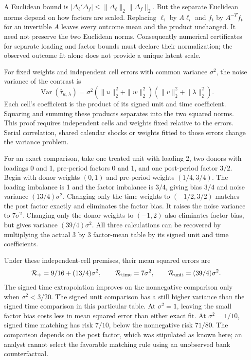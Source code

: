 A Euclidean bound is
$|\Delta_\ell'\Delta_f|\leq\|\Delta_\ell\|_2\|\Delta_f\|_2$.
But the separate Euclidean norms depend on how factors are scaled. Replacing
$\ell_i$ by $A\ell_i$ and $f_t$ by $A^{-T}f_t$ for an invertible $A$
leaves every outcome mean and the product unchanged. It need not preserve
the two Euclidean norms. Consequently numerical certificates for separate
loading and factor bounds must declare their normalization; the observed
outcome fit alone does not provide a unique latent scale.

For fixed weights and independent cell errors with common variance
$\sigma^2$, the noise variance of the contrast is
\begin{equation}
 \operatorname{Var}(\widehat\tau_{w,\lambda})
 =\sigma^2(\|u\|_2^2+\|w\|_2^2)
             (\|v\|_2^2+\|\lambda\|_2^2).
 \label{exec17:s6-sdid-noise}
\end{equation}
Each cell's coefficient is the product of its signed unit and time
coefficient. Squaring and summing these products separates into the two
squared norms. This proof requires independent cells and weights fixed
relative to the errors. Serial correlation, shared calendar shocks or
weights fitted to those errors change the variance problem.

For an exact comparison, take one treated unit with loading 2, two donors
with loadings 0 and 1, pre-period factors 0 and 1, and one post-period
factor $3/2$. Begin with donor weights $(0,1)$ and pre-period weights
$(1/4,3/4)$. The loading imbalance is 1 and the factor imbalance is
$3/4$, giving bias $3/4$ and noise variance $(13/4)\sigma^2$.
Changing only the time weights to $(-1/2,3/2)$ matches the post factor
exactly and eliminates the factor bias. It raises the noise variance to
$7\sigma^2$. Changing only the donor weights to $(-1,2)$ also
eliminates factor bias, but gives variance $(39/4)\sigma^2$.
All three calculations can be recovered by multiplying the actual
$3$ by $3$ factor-mean table by its signed unit and time coefficients.

Under these independent-cell premises, their mean squared errors are
\begin{equation}
 {\cal R}_{+}=9/16+(13/4)\sigma^2,\qquad
 {\cal R}_{\mathrm{time}}=7\sigma^2,\qquad
 {\cal R}_{\mathrm{unit}}=(39/4)\sigma^2.
 \label{exec17:s6-sdid-risk}
\end{equation}
The signed time extrapolation improves on the nonnegative comparison
only when $\sigma^2<3/20$. The signed unit comparison has a still
higher variance than the signed time comparison in this particular table.
At $\sigma^2=1$, leaving the small factor bias costs less in mean
squared error than either exact fit. At $\sigma^2=1/10$, signed time
matching has risk $7/10$, below the nonnegative risk $71/80$.
The comparison depends on the post factor, which was stipulated as known
here; an analyst cannot select the favorable matching rule using an
unobserved bank counterfactual.

